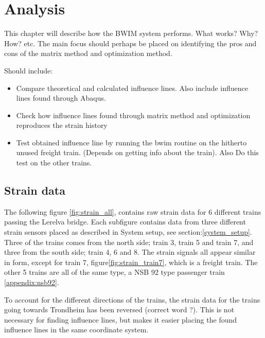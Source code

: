\section{Analysis}

This chapter will describe how the BWIM system performs. What works? Why? How? etc.
The main focus should perhaps be placed on identifying the pros and cons of the matrix method and optimization method.

Should include:
\begin{itemize}
\item Compare theoretical and calculated influence lines. Also include influence lines found through Abaqus.
\item Check how influence lines found through matrix method and optimization reproduces the strain history
\item Test obtained influence line by running the bwim routine on the hitherto unused freight train. (Depends on getting info about the train). Also Do this test on the other trains.
\end{itemize}

\subsection{Strain data}
The following figure \ref{fig:strain_all}, contains raw strain data for 6 different trains passing the Lerelva bridge. Each subfigure contains data from three different strain sensors placed as described in System setup, see section:\ref{system_setup}. Three of the trains comes from the north side; train 3, train 5 and train 7, and three from the south side; train 4, 6 and 8. The strain signals all appear similar in form, except for train 7, figure\ref{fig:strain_train7}, which is a freight train. The other 5 trains are all of the same type, a NSB 92 type passenger train \ref{appendix:nsb92}.

To account for the different directions of the trains, the strain data for the trains going towards Trondheim has been reversed (correct word ?). This is not necessary for finding influence lines, but makes it easier placing the found influence lines in the same coordinate system.

